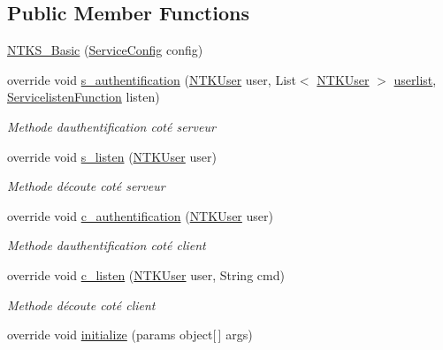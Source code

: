 \subsection*{Public Member Functions}
\begin{DoxyCompactItemize}
\item 
\mbox{\hyperlink{class_n_t_k_1_1_service_1_1_n_t_k_s___basic_a2fb30ddefef16ad8d121033ced7f0030}{N\+T\+K\+S\+\_\+\+Basic}} (\mbox{\hyperlink{struct_n_t_k_1_1_service_1_1_service_config}{Service\+Config}} config)
\item 
override void \mbox{\hyperlink{class_n_t_k_1_1_service_1_1_n_t_k_s___basic_a71e96e91d2c966446d12d88ea422b3ce}{s\+\_\+authentification}} (\mbox{\hyperlink{class_n_t_k_1_1_n_t_k_user}{N\+T\+K\+User}} user, List$<$ \mbox{\hyperlink{class_n_t_k_1_1_n_t_k_user}{N\+T\+K\+User}} $>$ \mbox{\hyperlink{class_n_t_k_1_1_service_1_1_n_t_k_service_a14977c798a805fea99802fa40da31aa0}{userlist}}, \mbox{\hyperlink{namespace_n_t_k_1_1_service_a49f4581ae6fb3e9c155d034c47791db9}{Servicelisten\+Function}} listen)
\begin{DoxyCompactList}\small\item\em Methode d\textquotesingle{}authentification coté serveur \end{DoxyCompactList}\item 
override void \mbox{\hyperlink{class_n_t_k_1_1_service_1_1_n_t_k_s___basic_a1d14f67d95eb73bc1966db7b4d84dc4b}{s\+\_\+listen}} (\mbox{\hyperlink{class_n_t_k_1_1_n_t_k_user}{N\+T\+K\+User}} user)
\begin{DoxyCompactList}\small\item\em Methode d\textquotesingle{}écoute coté serveur \end{DoxyCompactList}\item 
override void \mbox{\hyperlink{class_n_t_k_1_1_service_1_1_n_t_k_s___basic_a3cf6fce0651874b00a85d3a94515c059}{c\+\_\+authentification}} (\mbox{\hyperlink{class_n_t_k_1_1_n_t_k_user}{N\+T\+K\+User}} user)
\begin{DoxyCompactList}\small\item\em Methode d\textquotesingle{}authentification coté client \end{DoxyCompactList}\item 
override void \mbox{\hyperlink{class_n_t_k_1_1_service_1_1_n_t_k_s___basic_ae1e2c161689f944100438bcd61c9a99e}{c\+\_\+listen}} (\mbox{\hyperlink{class_n_t_k_1_1_n_t_k_user}{N\+T\+K\+User}} user, String cmd)
\begin{DoxyCompactList}\small\item\em Methode d\textquotesingle{}écoute coté client \end{DoxyCompactList}\item 
override void \mbox{\hyperlink{class_n_t_k_1_1_service_1_1_n_t_k_s___basic_a78fc9f1c34b15912b6c0e015e5ea64d2}{initialize}} (params object\mbox{[}$\,$\mbox{]} args)
\end{DoxyCompactItemize}
